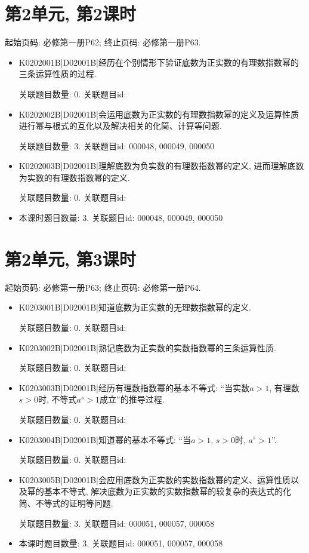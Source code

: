 \section*{第2单元, 第2课时}
起始页码: 必修第一册P62; 终止页码: 必修第一册P63.
\begin{itemize}
\item K0202001B|D02001B|经历在个别情形下验证底数为正实数的有理数指数幂的三条运算性质的过程.

关联题目数量: 0. 关联题目id: 

\item K0202002B|D02001B|会运用底数为正实数的有理数指数幂的定义及运算性质进行幂与根式的互化以及解决相关的化简、计算等问题.

关联题目数量: 3. 关联题目id: 000048, 000049, 000050

\item K0202003B|D02001B|理解底数为负实数的有理数指数幂的定义, 进而理解底数为实数的有理数指数幂的定义.

关联题目数量: 0. 关联题目id: 

\item 本课时题目数量: 3. 关联题目id: 000048, 000049, 000050

\end{itemize}

\section*{第2单元, 第3课时}
起始页码: 必修第一册P63; 终止页码: 必修第一册P64.
\begin{itemize}
\item K0203001B|D02001B|知道底数为正实数的无理数指数幂的定义.

关联题目数量: 0. 关联题目id: 

\item K0203002B|D02001B|熟记底数为正实数的实数指数幂的三条运算性质.

关联题目数量: 0. 关联题目id: 

\item K0203003B|D02001B|经历有理数指数幂的基本不等式: ``当实数$a>1$, 有理数$s>0$时, 不等式$a^s>1$成立''的推导过程.

关联题目数量: 0. 关联题目id: 

\item K0203004B|D02001B|知道幂的基本不等式: ``当$a>1$, $s>0$时, $a^s>1$''.

关联题目数量: 0. 关联题目id: 

\item K0203005B|D02001B|会应用底数为正实数的实数指数幂的定义、运算性质以及幂的基本不等式, 解决底数为正实数的实数指数幂的较复杂的表达式的化简、不等式的证明等问题.

关联题目数量: 3. 关联题目id: 000051, 000057, 000058

\item 本课时题目数量: 3. 关联题目id: 000051, 000057, 000058

\end{itemize}

